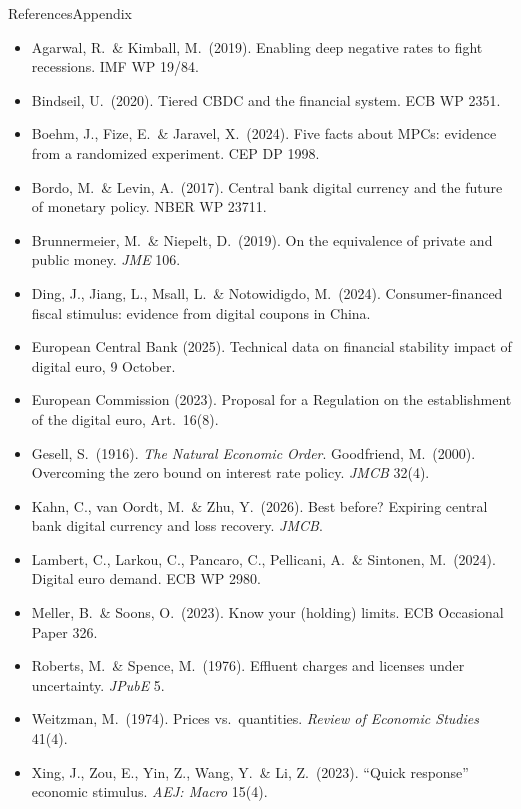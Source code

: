\documentclass[aspectratio=169,9pt]{beamer}
\begin{document}
\begin{frame}{References}{Appendix}
  \scriptsize
  \begin{itemize}
    \setlength\itemsep{0.1em}
    \item Agarwal, R.\ \& Kimball, M.\ (2019). Enabling deep negative rates to fight recessions. IMF WP 19/84.
    \item Bindseil, U.\ (2020). Tiered CBDC and the financial system. ECB WP 2351.
    \item Boehm, J., Fize, E.\ \& Jaravel, X.\ (2024). Five facts about MPCs: evidence from a randomized experiment. CEP DP 1998.
    \item Bordo, M.\ \& Levin, A.\ (2017). Central bank digital currency and the future of monetary policy. NBER WP 23711.
    \item Brunnermeier, M.\ \& Niepelt, D.\ (2019). On the equivalence of private and public money. \emph{JME} 106.
    \item Ding, J., Jiang, L., Msall, L.\ \& Notowidigdo, M.\ (2024). Consumer-financed fiscal stimulus: evidence from digital coupons in China.
    \item European Central Bank (2025). Technical data on financial stability impact of digital euro, 9 October.
    \item European Commission (2023). Proposal for a Regulation on the establishment of the digital euro, Art.\ 16(8).
    \item Gesell, S.\ (1916). \emph{The Natural Economic Order}. Goodfriend, M.\ (2000). Overcoming the zero bound on interest rate policy. \emph{JMCB} 32(4).
    \item Kahn, C., van Oordt, M.\ \& Zhu, Y.\ (2026). Best before? Expiring central bank digital currency and loss recovery. \emph{JMCB}.
    \item Lambert, C., Larkou, C., Pancaro, C., Pellicani, A.\ \& Sintonen, M.\ (2024). Digital euro demand. ECB WP 2980.
    \item Meller, B.\ \& Soons, O.\ (2023). Know your (holding) limits. ECB Occasional Paper 326.
    \item Roberts, M.\ \& Spence, M.\ (1976). Effluent charges and licenses under uncertainty. \emph{JPubE} 5.
    \item Weitzman, M.\ (1974). Prices vs.\ quantities. \emph{Review of Economic Studies} 41(4).
    \item Xing, J., Zou, E., Yin, Z., Wang, Y.\ \& Li, Z.\ (2023). ``Quick response'' economic stimulus. \emph{AEJ: Macro} 15(4).
  \end{itemize}
\end{frame}
\end{document}
